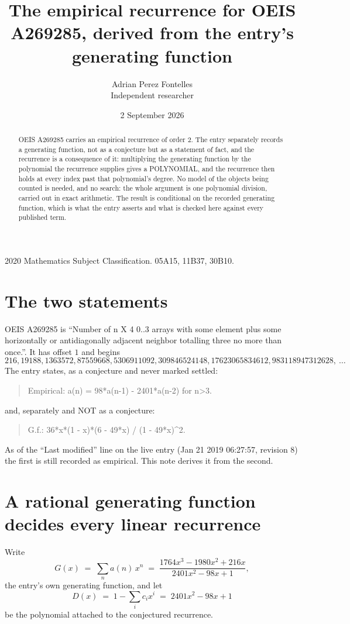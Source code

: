 \documentclass[11pt,a4paper]{article}
\title{The empirical recurrence for OEIS A269285, derived from the entry's generating function}
\author{Adrian Perez Fontelles\\ \small Independent researcher}
\date{2 September 2026}
\theoremstyle{plain}
\theoremstyle{definition}
\begin{document}
\maketitle

\begin{abstract}
OEIS A269285 carries an empirical recurrence of order $2$. The entry separately records a
generating function, not as a conjecture but as a statement of fact, and the recurrence is a
consequence of it: multiplying the generating function by the polynomial the recurrence
supplies gives a POLYNOMIAL, and the recurrence then holds at every index past that
polynomial's degree. No model of the objects being counted is needed, and no search: the
whole argument is one polynomial division, carried out in exact arithmetic. The result is
conditional on the recorded generating function, which is what the entry asserts and what is
checked here against every published term.
\end{abstract}

\noindent\small 2020 Mathematics Subject Classification. 05A15, 11B37, 30B10.\normalsize

\section{The two statements}

OEIS A269285 is ``Number of n X 4 0..3 arrays with some element plus some horizontally or antidiagonally adjacent neighbor totalling three no more than once.''. It has offset $1$ and begins
\[
216, 19188, 1363572, 87559668, 5306911092, 309846524148, 17623065834612, 983118947312628,\ \dots
\]
The entry states, as a conjecture and never marked settled:
\begin{quote}
Empirical: a(n) = 98*a(n-1) - 2401*a(n-2) for n>3.
\end{quote}
and, separately and NOT as a conjecture:
\begin{quote}
G.f.: 36*x*(1 - x)*(6 - 49*x) / (1 - 49*x)\^{}2.
\end{quote}
As of the ``Last modified'' line on the live entry (Jan 21 2019 06:27:57, revision 8) the first is still
recorded as empirical. This note derives it from the second.

\section{A rational generating function decides every linear recurrence}

Write
\[
G(x)\;=\;\sum_{n}a(n)\,x^{n}\;=\;\frac{1764 x^{3} - 1980 x^{2} + 216 x}{2401 x^{2} - 98 x + 1},
\]
the entry's own generating function, and let
\[
D(x)\;=\;1-\sum_i c_i x^{i}\;=\;2401 x^{2} - 98 x + 1
\]
be the polynomial attached to the conjectured recurrence.
\end{document}
